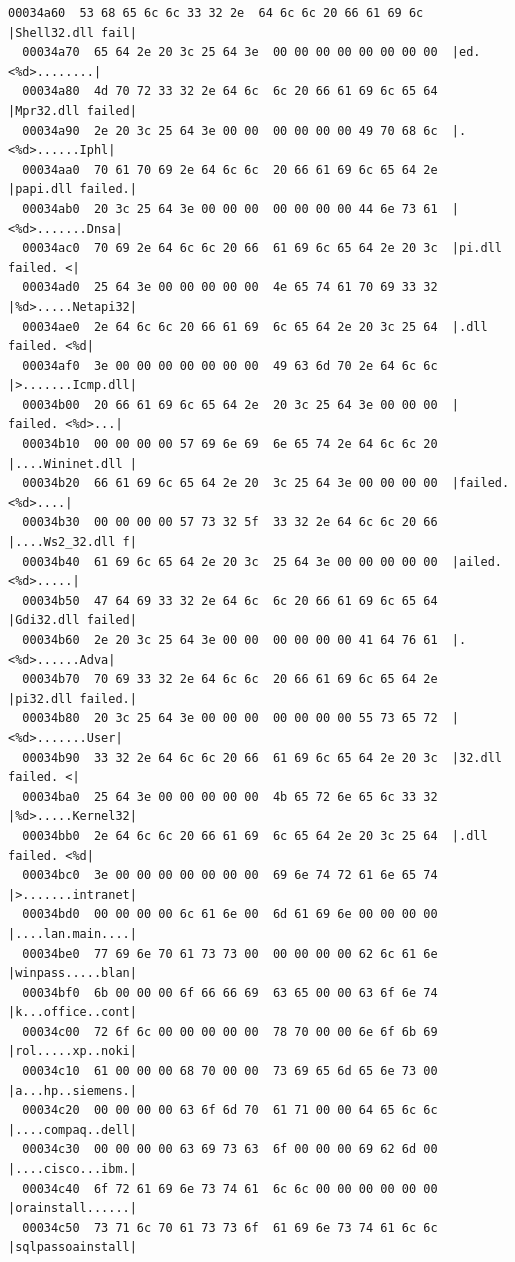\documentclass[]{project_plan}
\begin{document}
\begin{lstlisting}[basicstyle=\tiny]
  00034a60  53 68 65 6c 6c 33 32 2e  64 6c 6c 20 66 61 69 6c  |Shell32.dll fail|
  00034a70  65 64 2e 20 3c 25 64 3e  00 00 00 00 00 00 00 00  |ed. <%d>........|
  00034a80  4d 70 72 33 32 2e 64 6c  6c 20 66 61 69 6c 65 64  |Mpr32.dll failed|
  00034a90  2e 20 3c 25 64 3e 00 00  00 00 00 00 49 70 68 6c  |. <%d>......Iphl|
  00034aa0  70 61 70 69 2e 64 6c 6c  20 66 61 69 6c 65 64 2e  |papi.dll failed.|
  00034ab0  20 3c 25 64 3e 00 00 00  00 00 00 00 44 6e 73 61  | <%d>.......Dnsa|
  00034ac0  70 69 2e 64 6c 6c 20 66  61 69 6c 65 64 2e 20 3c  |pi.dll failed. <|
  00034ad0  25 64 3e 00 00 00 00 00  4e 65 74 61 70 69 33 32  |%d>.....Netapi32|
  00034ae0  2e 64 6c 6c 20 66 61 69  6c 65 64 2e 20 3c 25 64  |.dll failed. <%d|
  00034af0  3e 00 00 00 00 00 00 00  49 63 6d 70 2e 64 6c 6c  |>.......Icmp.dll|
  00034b00  20 66 61 69 6c 65 64 2e  20 3c 25 64 3e 00 00 00  | failed. <%d>...|
  00034b10  00 00 00 00 57 69 6e 69  6e 65 74 2e 64 6c 6c 20  |....Wininet.dll |
  00034b20  66 61 69 6c 65 64 2e 20  3c 25 64 3e 00 00 00 00  |failed. <%d>....|
  00034b30  00 00 00 00 57 73 32 5f  33 32 2e 64 6c 6c 20 66  |....Ws2_32.dll f|
  00034b40  61 69 6c 65 64 2e 20 3c  25 64 3e 00 00 00 00 00  |ailed. <%d>.....|
  00034b50  47 64 69 33 32 2e 64 6c  6c 20 66 61 69 6c 65 64  |Gdi32.dll failed|
  00034b60  2e 20 3c 25 64 3e 00 00  00 00 00 00 41 64 76 61  |. <%d>......Adva|
  00034b70  70 69 33 32 2e 64 6c 6c  20 66 61 69 6c 65 64 2e  |pi32.dll failed.|
  00034b80  20 3c 25 64 3e 00 00 00  00 00 00 00 55 73 65 72  | <%d>.......User|
  00034b90  33 32 2e 64 6c 6c 20 66  61 69 6c 65 64 2e 20 3c  |32.dll failed. <|
  00034ba0  25 64 3e 00 00 00 00 00  4b 65 72 6e 65 6c 33 32  |%d>.....Kernel32|
  00034bb0  2e 64 6c 6c 20 66 61 69  6c 65 64 2e 20 3c 25 64  |.dll failed. <%d|
  00034bc0  3e 00 00 00 00 00 00 00  69 6e 74 72 61 6e 65 74  |>.......intranet|
  00034bd0  00 00 00 00 6c 61 6e 00  6d 61 69 6e 00 00 00 00  |....lan.main....|
  00034be0  77 69 6e 70 61 73 73 00  00 00 00 00 62 6c 61 6e  |winpass.....blan|
  00034bf0  6b 00 00 00 6f 66 66 69  63 65 00 00 63 6f 6e 74  |k...office..cont|
  00034c00  72 6f 6c 00 00 00 00 00  78 70 00 00 6e 6f 6b 69  |rol.....xp..noki|
  00034c10  61 00 00 00 68 70 00 00  73 69 65 6d 65 6e 73 00  |a...hp..siemens.|
  00034c20  00 00 00 00 63 6f 6d 70  61 71 00 00 64 65 6c 6c  |....compaq..dell|
  00034c30  00 00 00 00 63 69 73 63  6f 00 00 00 69 62 6d 00  |....cisco...ibm.|
  00034c40  6f 72 61 69 6e 73 74 61  6c 6c 00 00 00 00 00 00  |orainstall......|
  00034c50  73 71 6c 70 61 73 73 6f  61 69 6e 73 74 61 6c 6c  |sqlpassoainstall|

\end{lstlisting}
\end{document}
